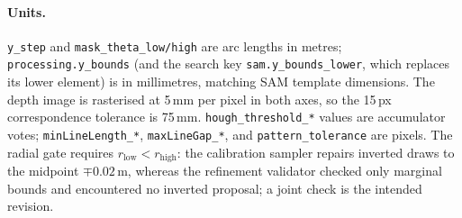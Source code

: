 \documentclass[a4paper,fleqn]{cas-dc}
\begin{document}
\paragraph{Units.}
\texttt{y\_step} and \texttt{mask\_theta\_low/high} are arc lengths in metres; \texttt{processing.y\_bounds} (and the search key \texttt{sam.y\_bounds\_lower}, which replaces its lower element) is in millimetres, matching SAM template dimensions. The depth image is rasterised at 5\,mm per pixel in both axes, so the 15\,px correspondence tolerance is 75\,mm. \texttt{hough\_threshold\_*} values are accumulator votes; \texttt{minLineLength\_*}, \texttt{maxLineGap\_*}, and \texttt{pattern\_tolerance} are pixels. The radial gate requires $r_{\mathrm{low}}<r_{\mathrm{high}}$: the calibration sampler repairs inverted draws to the midpoint $\mp0.02$\,m, whereas the refinement validator checked only marginal bounds and encountered no inverted proposal; a joint check is the intended revision.
\end{document}
